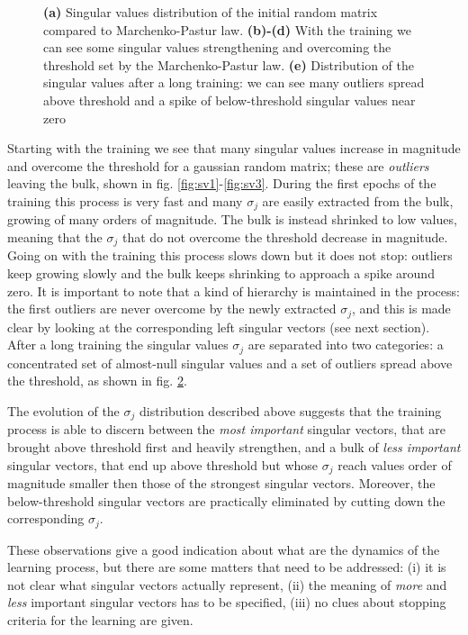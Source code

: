 \documentclass{revtex4-1}
\begin{document}
\begin{figure}
\begin{subfigure}{.64\linewidth}
    \caption{}  
    \label{fig:sv4}
  \end{subfigure}
 \caption{\textbf{(a)} Singular values distribution of the initial random matrix compared to Marchenko-Pastur law. \textbf{(b)-(d)} With the training we can see some singular values strengthening and overcoming the threshold set by the Marchenko-Pastur law. \textbf{(e)} Distribution of the singular values after a long training: we can see many outliers spread above threshold and a spike of below-threshold singular values near zero}
\end{figure}

Starting with the training we see that many singular values increase in magnitude and overcome the threshold for a gaussian random matrix; these are \textit{outliers} leaving the bulk, shown in fig. \ref{fig:sv1}-\ref{fig:sv3}. During the first epochs of the training this process is very fast and many \(\sigma_j\) are easily extracted from the bulk, growing of many orders of magnitude. The bulk is instead shrinked to low values, meaning that the \(\sigma_j\) that do not overcome the threshold decrease in magnitude. Going on with the training this process slows down but it does not stop: outliers keep growing slowly and the bulk keeps shrinking to approach a spike around zero. It is important to note that a kind of hierarchy is maintained in the process: the first outliers are never overcome by the newly extracted \(\sigma_j\), and this is made clear by looking at the corresponding left singular vectors (see next section).
After a long training the singular values \(\sigma_j\) are separated into two categories: a concentrated set of almost-null singular values and a set of outliers spread above the threshold, as shown in fig. \ref{fig:sv4}.

The evolution of the \(\sigma_j\) distribution described above suggests that the training process is able to discern between the \textit{most important} singular vectors, that are brought above threshold first and heavily strengthen, and a bulk of \textit{less important} singular vectors, that end up above threshold but whose \( \sigma_j\) reach values order of magnitude smaller then those of the strongest singular vectors. Moreover, the below-threshold singular vectors are practically eliminated by cutting down the corresponding \(\sigma_j\).

These observations give a good indication about what are the dynamics of the learning process, but there are some matters that need to be addressed: (i) it is not clear what singular vectors actually represent, (ii) the meaning of \textit{more} and \textit{less} important singular vectors has to be specified, (iii) no clues about stopping criteria for the learning are given.
\end{document}

